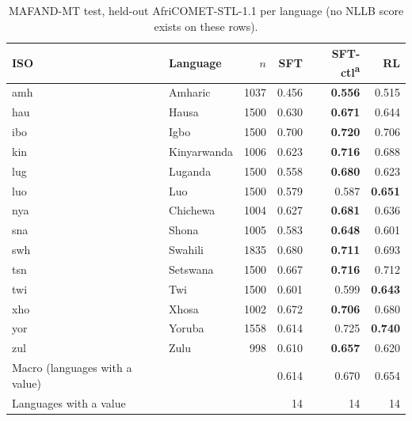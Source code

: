 \begin{table}[t]
\centering\footnotesize
\setlength{\tabcolsep}{3pt}
\begin{tabular}{@{}llrrrr@{}}
\toprule
ISO & Language & $n$ & SFT & SFT-ctl\textsuperscript{a} & RL \\
\midrule
amh & Amharic & 1037 & 0.456 & \textbf{0.556} & 0.515 \\
hau & Hausa & 1500 & 0.630 & \textbf{0.671} & 0.644 \\
ibo & Igbo & 1500 & 0.700 & \textbf{0.720} & 0.706 \\
kin & Kinyarwanda & 1006 & 0.623 & \textbf{0.716} & 0.688 \\
lug & Luganda & 1500 & 0.558 & \textbf{0.680} & 0.623 \\
luo & Luo & 1500 & 0.579 & 0.587 & \textbf{0.651} \\
nya & Chichewa & 1004 & 0.627 & \textbf{0.681} & 0.636 \\
sna & Shona & 1005 & 0.583 & \textbf{0.648} & 0.601 \\
swh & Swahili & 1835 & 0.680 & \textbf{0.711} & 0.693 \\
tsn & Setswana & 1500 & 0.667 & \textbf{0.716} & 0.712 \\
twi & Twi & 1500 & 0.601 & 0.599 & \textbf{0.643} \\
xho & Xhosa & 1002 & 0.672 & \textbf{0.706} & 0.680 \\
yor & Yoruba & 1558 & 0.614 & 0.725 & \textbf{0.740} \\
zul & Zulu & 998 & 0.610 & \textbf{0.657} & 0.620 \\
\midrule
Macro (languages with a value) & & & 0.614 & 0.670 & 0.654 \\
Languages with a value & & & 14 & 14 & 14 \\
\bottomrule
\end{tabular}
\caption{MAFAND-MT test, held-out AfriCOMET-STL-1.1 per language (no NLLB score exists on these rows).}
\label{tab:full-mafand-comet}
\end{table}
